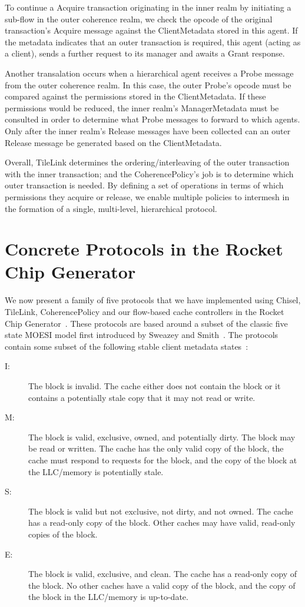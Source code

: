 To continue a Acquire transaction originating in the inner realm
by initiating a sub-flow in the outer coherence realm, we check the opcode
of the original transaction's Acquire message against the ClientMetadata stored in this agent.
If the metadata indicates that an outer transaction is required, this agent (acting as a client),
sends a further request to its manager and awaits a Grant response.

Another transalation occurs when a hierarchical agent receives a Probe message from
the outer coherence realm.
In this case, the outer Probe's opcode must be compared against the permissions stored in the ClientMetadata.
If these permissions would be reduced, the inner realm's ManagerMetadata must be consulted in order
to determine what Probe messages to forward to which agents.
Only after the inner realm's Release messages have been collected can an outer Release message be generated
based on the ClientMetadata.

Overall, TileLink determines the ordering/interleaving of the outer transaction with the inner transaction;
and the CoherencePolicy's job is to determine which outer transaction is needed.
By defining a set of operations in terms of which permissions they acquire or release,
we enable multiple policies to intermesh in the formation of a single, multi-level, hierarchical protocol.


\section{Concrete Protocols in the Rocket Chip Generator}

We now present a family of five protocols that we have implemented using Chisel, TileLink, CoherencePolicy
and our flow-based cache controllers in the Rocket Chip Generator~\cite{rocket}.
These protocols are based around a subset of the classic five state MOESI model
first introduced by Sweazey and Smith~\cite{sweazey1986class}.
The protocols contain some subset of the following stable client metadata states~\cite{sorin2011primer}:
\begin{description}
\item[I:] The block is invalid. The cache either does not contain the block or it contains a potentially stale copy that it may not read or write.
\item[M:] The block is valid, exclusive, owned, and potentially dirty. The block may be
read or written. The cache has the only valid copy of the block, the cache must respond to
requests for the block, and the copy of the block at the LLC/memory is potentially stale. 
\item[S:] The block is valid but not exclusive, not dirty, and not owned. The cache has a read-only copy of the block. Other caches may have valid, read-only copies of the block.
\item[E:] The block is valid, exclusive, and clean. The cache has a read-only copy of the
block. No other caches have a valid copy of the block, and the copy of the block in the
LLC/memory is up-to-date. 
\end{description}

